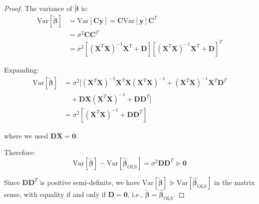 \documentclass{article}
\begin{document}
\begin{proof}
The variance of $\tilde{\boldsymbol{\beta}}$ is:
\begin{align}
\text{Var}[\tilde{\boldsymbol{\beta}}] &= \text{Var}[\mathbf{C}\mathbf{y}] = \mathbf{C}\text{Var}[\mathbf{y}]\mathbf{C}^T \\
&= \sigma^2\mathbf{C}\mathbf{C}^T \\
&= \sigma^2[(\mathbf{X}^T\mathbf{X})^{-1}\mathbf{X}^T + \mathbf{D}][(\mathbf{X}^T\mathbf{X})^{-1}\mathbf{X}^T + \mathbf{D}]^T
\end{align}

Expanding:
\begin{align}
\text{Var}[\tilde{\boldsymbol{\beta}}] &= \sigma^2[(\mathbf{X}^T\mathbf{X})^{-1}\mathbf{X}^T\mathbf{X}(\mathbf{X}^T\mathbf{X})^{-1} + (\mathbf{X}^T\mathbf{X})^{-1}\mathbf{X}^T\mathbf{D}^T \\
&\quad + \mathbf{D}\mathbf{X}(\mathbf{X}^T\mathbf{X})^{-1} + \mathbf{D}\mathbf{D}^T] \\
&= \sigma^2[(\mathbf{X}^T\mathbf{X})^{-1} + \mathbf{D}\mathbf{D}^T]
\end{align}

where we used $\mathbf{D}\mathbf{X} = \mathbf{0}$.

Therefore:
\begin{equation}
\text{Var}[\tilde{\boldsymbol{\beta}}] - \text{Var}[\hat{\boldsymbol{\beta}}_{\text{OLS}}] = \sigma^2\mathbf{D}\mathbf{D}^T \succeq \mathbf{0}
\end{equation}

Since $\mathbf{D}\mathbf{D}^T$ is positive semi-definite, we have $\text{Var}[\tilde{\boldsymbol{\beta}}] \succeq \text{Var}[\hat{\boldsymbol{\beta}}_{\text{OLS}}]$ in the matrix sense, with equality if and only if $\mathbf{D} = \mathbf{0}$, i.e., $\tilde{\boldsymbol{\beta}} = \hat{\boldsymbol{\beta}}_{\text{OLS}}$.
\end{proof}
\end{document}
